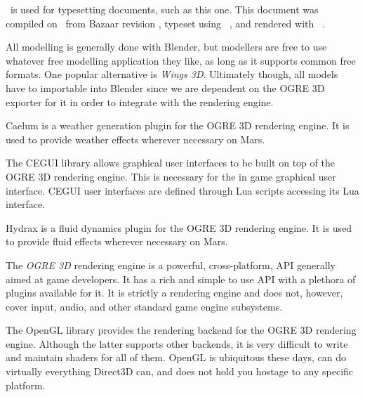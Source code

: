 
\startitemize[3]
\setupwhitespace[big]
\head {\it \CONTEXT}

\CONTEXT\ is used for typesetting documents, such as this one. This document was compiled on \currentdate\ from Bazaar revision \BazaarRevision, typeset using \CONTEXT\ \contextversion, and rendered with \texenginename\ \texengineversion.
\stopitemize


\startitemize[3]
\setupwhitespace[big]

All modelling is generally done with Blender, but modellers are free to use whatever free modelling application they like, as long as it supports common free formats. One popular alternative is {\it Wings 3D}. Ultimately though, all models have to importable into Blender since we are dependent on the OGRE 3D exporter for it in order to integrate with the rendering engine.


Caelum is a weather generation plugin for the OGRE 3D rendering engine. It is used to provide weather effects wherever necessary on Mars.


The CEGUI library allows graphical user interfaces to be built on top of the OGRE 3D rendering engine. This is necessary for the in game graphical user interface. CEGUI user interfaces are defined through Lua scripts accessing its Lua interface.


Hydrax is a fluid dynamics plugin for the OGRE 3D rendering engine. It is used to provide fluid effects wherever necessary on Mars.


The {\it OGRE 3D} rendering engine is a powerful, cross-platform, API generally aimed at game developers. It has a rich and simple to use API with a plethora of plugins available for it. It is strictly a rendering engine and does not, however, cover input, audio, and other standard game engine subsystems.


The OpenGL library provides the rendering backend for the OGRE 3D rendering engine. Although the latter supports other backends, it is very difficult to write and maintain shaders for all of them. OpenGL is ubiquitous these days, can do virtually everything Direct3D can, and does not hold you hostage to any specific platform.

